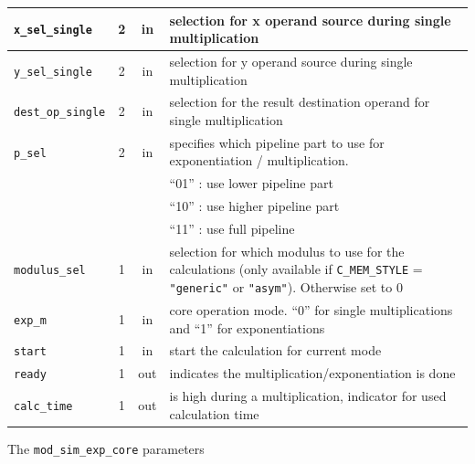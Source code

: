 \begin{tabular}{|l|c|c|p{8cm}|}
\hline
\verb|x_sel_single| & 2     & in    & selection for x operand source during single multiplication \bigstrut\\
\hline
\verb|y_sel_single| & 2     & in    & selection for y operand source during single multiplication \bigstrut\\
\hline
\verb|dest_op_single| & 2     & in    & selection for the result destination operand for single multiplication \bigstrut\\
\hline
\verb|p_sel| & 2     & in    & specifies which pipeline part to use for exponentiation / multiplication. \bigstrut[t]\\
      &       &       & ``01'' : use lower pipeline part \\
      &       &       & ``10'' : use higher pipeline part \\
      &       &       & ``11'' : use full pipeline \bigstrut[b]\\
\hline
\verb|modulus_sel| & 1     & in    & selection for which modulus to use for the calculations (only available if \verb|C_MEM_STYLE| = \verb|"generic"| or \verb|"asym"|). Otherwise set to 0 \bigstrut\\
\hline
\verb|exp_m| & 1     & in    & core operation mode. ``0'' for single multiplications and ``1'' for exponentiations \bigstrut\\
\hline
\verb|start| & 1     & in    & start the calculation for current mode \bigstrut\\
\hline
\verb|ready| & 1     & out   & indicates the multiplication/exponentiation is done \bigstrut\\
\hline
\verb|calc_time| & 1     & out   & is high during a multiplication, indicator for used calculation time \bigstrut\\
\hline
\end{tabular}%
\newpage
The \verb|mod_sim_exp_core| parameters\\
